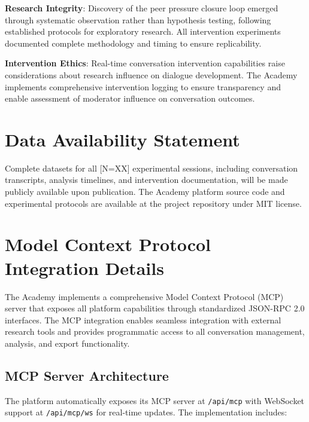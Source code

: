 \documentclass[11pt,letterpaper]{article}
\newcommand{\theacademy}{The Academy}
\newcommand{\totalSessions}{[N=XX]} %
\begin{document}
\textbf{Research Integrity}: Discovery of the peer pressure closure loop emerged through systematic observation rather than hypothesis testing, following established protocols for exploratory research. All intervention experiments documented complete methodology and timing to ensure replicability.

\textbf{Intervention Ethics}: Real-time conversation intervention capabilities raise considerations about research influence on dialogue development. \theacademy{} implements comprehensive intervention logging to ensure transparency and enable assessment of moderator influence on conversation outcomes.

\section*{Data Availability Statement}

Complete datasets for all \totalSessions{} experimental sessions, including conversation transcripts, analysis timelines, and intervention documentation, will be made publicly available upon publication. \theacademy{} platform source code and experimental protocols are available at the project repository under MIT license.




\appendix

\section{Model Context Protocol Integration Details}
\label{app:mcp}

\theacademy{} implements a comprehensive Model Context Protocol (MCP) server that exposes all platform capabilities through standardized JSON-RPC 2.0 interfaces. The MCP integration enables seamless integration with external research tools and provides programmatic access to all conversation management, analysis, and export functionality.

\subsection{MCP Server Architecture}

The platform automatically exposes its MCP server at \texttt{/api/mcp} with WebSocket support at \texttt{/api/mcp/ws} for real-time updates. The implementation includes:
\end{document}
